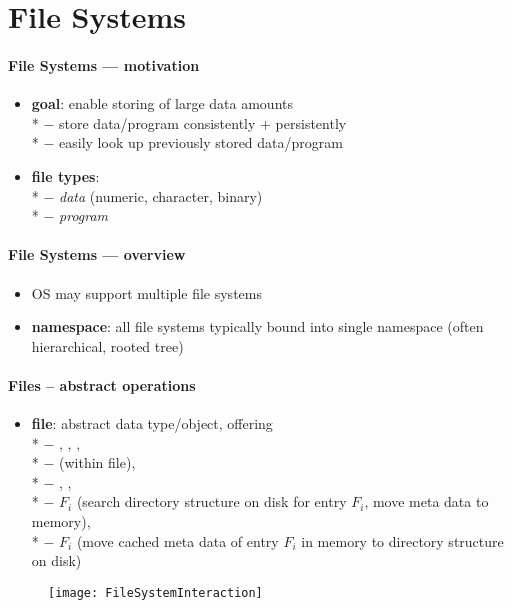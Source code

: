 \section{File Systems}

\paragraph{File Systems --- motivation}
\begin{itemize}
  \item \textbf{goal}: enable storing of large data amounts \\*
    $ - $ store data/program consistently + persistently \\*
    $ - $ easily look up previously stored data/program
  \item \textbf{file types}: \\*
    $ - $ \emph{data} (numeric, character, binary) \\*
    $ - $ \emph{program}
\end{itemize}

\paragraph{File Systems --- overview}
\begin{itemize}
  \item OS may support multiple file systems
  \item \textbf{namespace}: all file systems typically bound into single namespace (often hierarchical, rooted tree)
\end{itemize}

\paragraph{Files -- abstract operations}
\begin{itemize}
  \item \textbf{file}: abstract data type/object, offering \\*
    $ - $ , , , \\*
    $ - $  (within file), \\*
    $ - $ , , \\*
    $ - $ $ F_i $\code{)} (search directory structure on disk for entry $ F_i $, move meta data to memory),  \\*
    $ - $ $ F_i $\code{)} (move cached meta data of entry $ F_i $ in memory to directory structure on disk)
\end{itemize}
\begin{figure}[h]\centering\label{FileSystemInteraction}\texttt{[image: FileSystemInteraction]}\end{figure}

